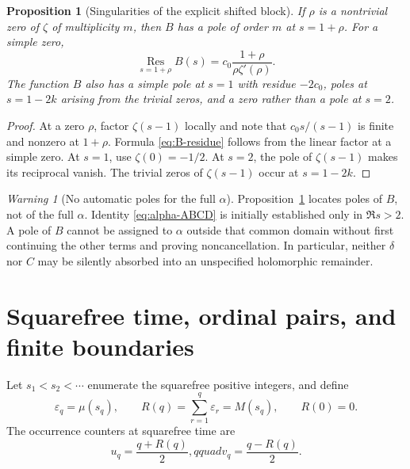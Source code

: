 \documentclass[11pt]{amsart}
\numberwithin{equation}{section}
\theoremstyle{plain}
\newtheorem{proposition}[theorem]{Proposition}
\theoremstyle{definition}
\theoremstyle{remark}
\newtheorem{warning}[theorem]{Warning}
\newcommand{\Res}{\operatorname*{Res}}
\begin{document}
\begin{proposition}[Singularities of the explicit shifted block]
\label{prop:B-singularities}
If $\rho$ is a nontrivial zero of $\zeta$ of multiplicity $m$, then $B$ has
a pole of order $m$ at $s=1+\rho$.  For a simple zero,
\begin{equation}
\Res_{s=1+\rho}B(s)
=c_0\frac{1+\rho}{\rho\zeta'(\rho)}.
\label{eq:B-residue}
\end{equation}
The function $B$ also has a simple pole at $s=1$ with residue $-2c_0$, poles
at $s=1-2k$ arising from the trivial zeros, and a zero rather than a pole at
$s=2$.
\end{proposition}

\begin{proof}
At a zero $\rho$, factor $\zeta(s-1)$ locally and note that
$c_0s/(s-1)$ is finite and nonzero at $1+\rho$.  Formula
\eqref{eq:B-residue} follows from the linear factor at a simple zero.  At
$s=1$, use $\zeta(0)=-1/2$.  At $s=2$, the pole of $\zeta(s-1)$ makes its
reciprocal vanish.  The trivial zeros of $\zeta(s-1)$ occur at $s=1-2k$.
\end{proof}

\begin{warning}[No automatic poles for the full $\alpha$]
\label{warn:alpha-poles}
Proposition~\ref{prop:B-singularities} locates poles of $B$, not of the full
$\alpha$.  Identity \eqref{eq:alpha-ABCD} is initially established only in
$\Re s>2$.  A pole of $B$ cannot be assigned to $\alpha$ outside that common
domain without first continuing the other terms and proving noncancellation.
In particular, neither $\delta$ nor $C$ may be silently absorbed into an
unspecified holomorphic remainder.
\end{warning}

\section{Squarefree time, ordinal pairs, and finite boundaries}
\label{sec:squarefree-pairs}

Let $s_1<s_2<\cdots$ enumerate the squarefree positive integers, and define
\begin{equation}
\varepsilon_q=\mu(s_q),\qquad
R(q)=\sum_{r=1}^{q}\varepsilon_r=M(s_q),\qquad R(0)=0.
\label{eq:squarefree-clock}
\end{equation}
The occurrence counters at squarefree time are
\begin{equation}
u_q=\frac{q+R(q)}2,qquad
v_q=\frac{q-R(q)}2.
\label{eq:uv-counters}
\end{equation}
\end{document}
